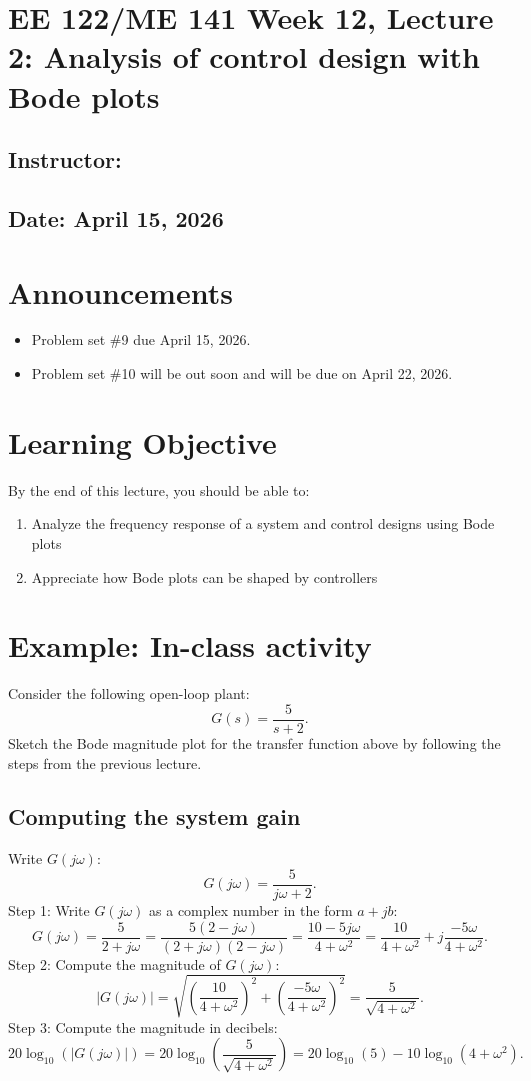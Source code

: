 \documentclass{ee122_notes}
\renewcommand{\releasedate}{April 15, 2026}
\begin{document}
\section*{EE 122/ME 141 Week 12, Lecture 2: Analysis of control design with Bode plots}
\subsection*{Instructor: \instructor}
\subsection*{Date: \releasedate}
\section{Announcements}
\begin{itemize}
    \item Problem set \#9 due April 15, 2026.
    \item Problem set \#10 will be out soon and will be due on April 22, 2026.
\end{itemize}
\section{Learning Objective}
By the end of this lecture, you should be able to:
\begin{enumerate}
    \item Analyze the frequency response of a system and control designs using Bode plots
    \item Appreciate how Bode plots can be shaped by controllers
\end{enumerate}
\section{Example: In-class activity}
Consider the following open-loop plant:
\[
G(s) = \frac{5}{s+2}.
\]
Sketch the Bode magnitude plot for the transfer function above by following the steps from the previous lecture. 
\subsection{Computing the system gain}
Write $G(j\omega)$:
\[
G(j\omega) = \frac{5}{j\omega + 2}.
\]
Step 1: Write $G(j\omega)$ as a complex number in the form $a + jb$:
\[
G(j\omega) = \frac{5}{2 + j\omega} = \frac{5(2 - j\omega)}{(2 + j\omega)(2 - j\omega)} = \frac{10 - 5j\omega}{4 + \omega^2} = \frac{10}{4 + \omega^2} + j\frac{-5\omega}{4 + \omega^2}.
\]
Step 2: Compute the magnitude of $G(j\omega)$:
\[
|G(j\omega)| = \sqrt{\left(\frac{10}{4 + \omega^2}\right)^2 + \left(\frac{-5\omega}{4 + \omega^2}\right)^2} = \frac{5}{\sqrt{4 + \omega^2}}.
\]
Step 3: Compute the magnitude in decibels:
\[
20\log_{10}(|G(j\omega)|) = 20\log_{10}\left(\frac{5}{\sqrt{4 + \omega^2}}\right) = 20\log_{10}(5) - 10\log_{10}(4 + \omega^2).
\]
\end{document}
